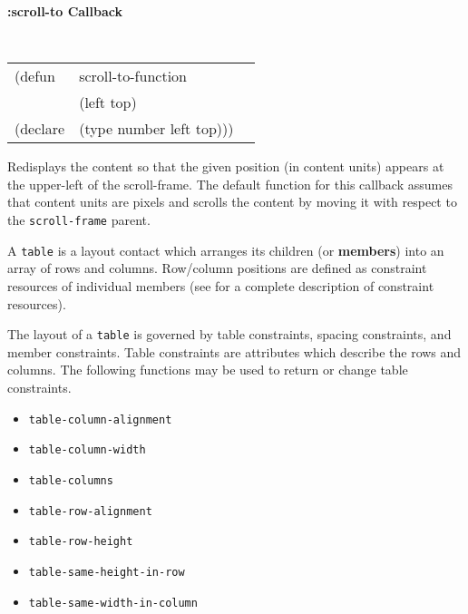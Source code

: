 {\samepage
{\large {\bf :scroll-to \hfill Callback}} 
\begin{flushright} 
\parbox[t]{6.125in}{
\tt
\begin{tabular}{lll}
\raggedright
(defun & scroll-to-function & \\ 
& (left top) \\
(declare &(type  number  left top)))
\end{tabular}
\rm

}\end{flushright}}

\begin{flushright} \parbox[t]{6.125in}{
Redisplays the content so that the given
position (in content units) appears at the upper-left of the scroll-frame.  The
default function for this callback assumes that content units are pixels and
scrolls the content by moving it with respect to the {\tt scroll-frame} parent.
}\end{flushright}

	


\vfill\pagebreak




A {\tt table} is a layout contact  which arranges its children
(or {\bf members}) into an array of rows and columns.
Row/column positions are defined as constraint resources of individual members
(see \cite{clue} for a complete description of constraint
resources).


The layout of a {\tt table} is governed by table constraints, spacing constraints,
and member constraints.  Table constraints are attributes which describe the rows
and columns.  The following functions may be used to return or change table constraints.

\begin{itemize}
\item {\tt table-column-alignment}
\item {\tt table-column-width}
\item {\tt table-columns}
\item {\tt table-row-alignment}
\item {\tt table-row-height}
\item {\tt table-same-height-in-row}
\item {\tt table-same-width-in-column}
\end{itemize}

